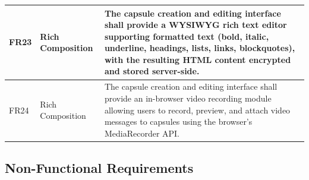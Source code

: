 \documentclass[12pt, a4paper]{article}
\begin{document}
\begin{longtable}{|p{0.8cm}|p{3.5cm}|p{8.5cm}|}
\hline
FR23 & Rich Composition & The capsule creation and editing interface shall provide a WYSIWYG rich text editor supporting formatted text (bold, italic, underline, headings, lists, links, blockquotes), with the resulting HTML content encrypted and stored server-side. \\
\hline
FR24 & Rich Composition & The capsule creation and editing interface shall provide an in-browser video recording module allowing users to record, preview, and attach video messages to capsules using the browser's MediaRecorder API. \\
\hline
\end{longtable}

\subsection{Non-Functional Requirements}
\end{document}
